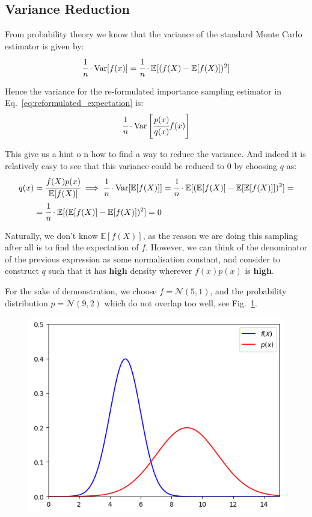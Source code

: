 \documentclass[12pt,a4paper]{book}
\begin{document}
\subsection{Variance Reduction}
From probability theory we know that the variance of the standard Monte Carlo estimator is given by:
\begin{equation}
\cfrac{1}{n}\cdot\text{Var}[f(x)] = \cfrac{1}{n}\cdot\mathbb{E}[(f(X)-\mathbb{E}[f(X)])^2]
\end{equation}

Hence the variance for the re-formulated importance sampling estimator in Eq.~\ref{eq:reformulated_expectation} is:
\begin{equation}
\cfrac{1}{n}\cdot\text{Var}\left[\cfrac{p(x)}{q(x)}f(x)\right]
\end{equation}

This give us a hint o	n how to find a way to reduce the variance. And indeed it is relatively easy to see that this variance could be reduced to 0 by choosing $q$ as:
\begin{equation}
\begin{aligned}
q(x)&=\cfrac{f(X)p(x)}{\mathbb{E}[f(X)]} \implies \cfrac{1}{n}\cdot\text{Var}[\mathbb{E}[f(X)]] = \cfrac{1}{n}\cdot\mathbb{E}[(\mathbb{E}[f(X)]-\mathbb{E}[\mathbb{E}[f(X)]])^2]=\\
&=\cfrac{1}{n}\cdot\mathbb{E}[(\mathbb{E}[f(X)]-\mathbb{E}[f(X)])^2] = 0
\end{aligned}
\end{equation}

Naturally, we don’t know $\mathbb{E}[f(X)]$, as the reason we are doing this sampling after all is to find the expectation of $f$.
However, we can think of the denominator of the previous expression as some normalisation constant, and consider to construct $q$ such that it has \textbf{high} density wherever $f(x)p(x)$ is \textbf{high}.

For the sake of demonstration, we choose $f=\mathcal{N}(5, 1)$, and the probability distribution $p=\mathcal{N}(9,2)$ which do not overlap too well, see Fig.~\ref{fig:f_and_p}.
\begin{figure}[htbp]
\begin{center}
\includegraphics[width=0.5\linewidth]{addons/f_and_p}
\end{center}
\label{fig:f_and_p}
\end{figure}
\end{document}
